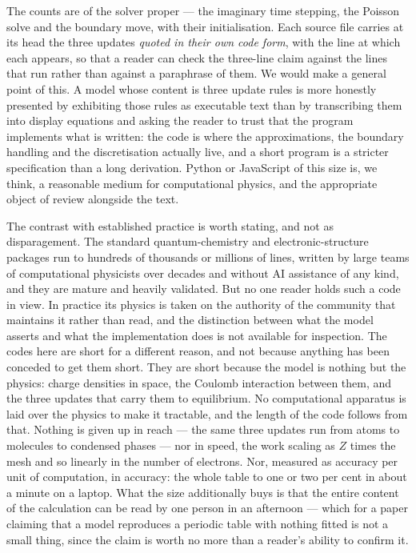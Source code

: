 \documentclass[11pt]{article}
\begin{document}
\noindent The counts are of the solver proper --- the imaginary time stepping, the
Poisson solve and the boundary move, with their initialisation. Each source file carries at its
head the three updates \emph{quoted in their own code form}, with the line at which each
appears, so that a reader can check the three-line claim against the lines that run rather than
against a paraphrase of them. We would make a general point of this. A model whose content is
three update rules is more honestly presented by exhibiting those rules as executable text than
by transcribing them into display equations and asking the reader to trust that the program
implements what is written: the code is where the approximations, the boundary handling and the
discretisation actually live, and a short program is a stricter specification than a long
derivation. Python or JavaScript of this size is, we think, a reasonable medium for
computational physics, and the appropriate object of review alongside the text.

The contrast with established practice is worth stating, and not as disparagement. The standard
quantum-chemistry and electronic-structure packages run to hundreds of thousands or millions of
lines, written by large teams of computational physicists over decades and without AI
assistance of any kind, and they are mature and heavily validated. But no one reader holds such
a code in view. In practice its physics is taken
on the authority of the community that maintains it rather than read, and the distinction
between what the model asserts and what the implementation does is not available for
inspection. The codes here are short for a different reason, and not because anything has been
conceded to get them short. They are short because the model is nothing but the physics:
charge densities in space, the Coulomb interaction between them, and the three updates that
carry them to equilibrium. No computational apparatus is laid over the physics to make it
tractable, and the length of the code follows from that. Nothing is given up in reach --- the same three updates run from atoms to
molecules to condensed phases --- nor in speed, the work scaling as $Z$ times the mesh and so
linearly in the number of electrons. Nor, measured as accuracy per unit of computation, in
accuracy: the whole table to one or two per cent in about a minute on a laptop. What the size
additionally buys is that the entire content of the calculation can be read by one person in an
afternoon --- which for a paper claiming that a model reproduces a periodic table with nothing
fitted is not a small thing, since the claim is worth no more than a reader's ability to
confirm it.
\end{document}
